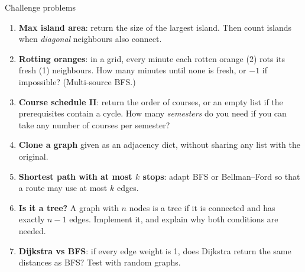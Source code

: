 \documentclass[aspectratio=169,10pt]{beamer}
\begin{document}
\begin{frame}{Challenge problems}
\small
\begin{enumerate}\setlength\itemsep{3pt}
\item \textbf{Max island area}: return the size of the largest island. Then count islands when \emph{diagonal} neighbours also connect.
\item \textbf{Rotting oranges}: in a grid, every minute each rotten orange (2) rots its fresh (1) neighbours. How many minutes until none is fresh, or $-1$ if impossible? (Multi-source BFS.)
\item \textbf{Course schedule II}: return the order of courses, or an empty list if the prerequisites contain a cycle. How many \emph{semesters} do you need if you can take any number of courses per semester?
\item \textbf{Clone a graph} given as an adjacency dict, without sharing any list with the original.
\item \textbf{Shortest path with at most $k$ stops}: adapt BFS or Bellman--Ford so that a route may use at most $k$ edges.
\item \textbf{Is it a tree?} A graph with $n$ nodes is a tree if it is connected and has exactly $n-1$ edges. Implement it, and explain why both conditions are needed.
\item \textbf{Dijkstra vs BFS}: if every edge weight is 1, does Dijkstra return the same distances as BFS? Test with random graphs.
\end{enumerate}
\end{frame}
\end{document}
